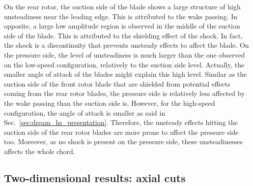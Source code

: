 On the rear rotor, the suction side of the blade 
shows a large structure of high unsteadiness near 
the leading edge. This is attributed to the wake passing.
In opposite, a large low amplitude region is observed in the
middle of the suction side of the blade. This is attributed
to the shielding effect of the shock. In fact, the shock is 
a discontinuity that prevents unsteady effects to affect the
blade. On the pressure side, the level of unsteadiness is much larger
than the one observed on the low-speed configuration, relatively
to the suction side level. Actually, the smaller
angle of attack of the blades might explain this high level.
Similar as the suction side of the front rotor
blade that are shielded from potential effects coming
from the rear rotor blades, the pressure side is relatively
less affected by the wake passing than the suction side is.
However, for the high-speed configuration, the angle of
attack is smaller as said in Sec.~\ref{sec:dream_hs_presentation}.
Therefore, the unsteady effects hitting the suction side of the
rear rotor blades are more prone to affect the pressure side
too. Moreover, as no shock is present on the pressure side,
these unsteadinesses affects the whole chord. 

\subsection{Two-dimensional results: axial cuts}
\label{sub:dream_hs_hb_axial_cuts}

